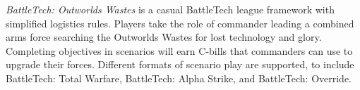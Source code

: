 \emph{BattleTech: Outworlds Wastes} is a casual BattleTech league framework with simplified logistics rules.
Players take the role of commander leading a combined arms force searching the Outworlds Wastes for lost technology and glory.
Completing objectives in scenarios will earn C-bills that commanders can use to upgrade their forces.
Different formats of scenario play are supported, to include BattleTech: Total Warfare, BattleTech: Alpha Strike, and BattleTech: Override.
